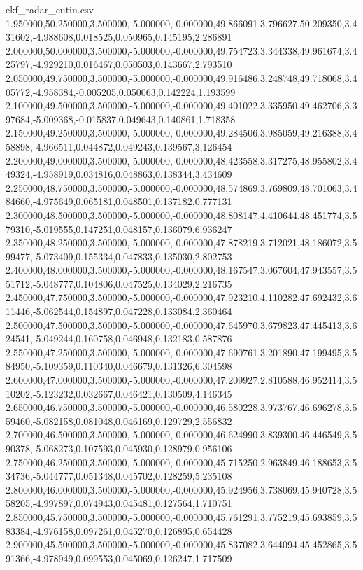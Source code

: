 \begin{filecontents*}[overwrite]{ekf_radar_cutin.csv}
1.950000,50.250000,3.500000,-5.000000,-0.000000,49.866091,3.796627,50.209350,3.431602,-4.988608,0.018525,0.050965,0.145195,2.286891
2.000000,50.000000,3.500000,-5.000000,-0.000000,49.754723,3.344338,49.961674,3.425797,-4.929210,0.016467,0.050503,0.143667,2.793510
2.050000,49.750000,3.500000,-5.000000,-0.000000,49.916486,3.248748,49.718068,3.405772,-4.958384,-0.005205,0.050063,0.142224,1.193599
2.100000,49.500000,3.500000,-5.000000,-0.000000,49.401022,3.335950,49.462706,3.397684,-5.009368,-0.015837,0.049643,0.140861,1.718358
2.150000,49.250000,3.500000,-5.000000,-0.000000,49.284506,3.985059,49.216388,3.458898,-4.966511,0.044872,0.049243,0.139567,3.126454
2.200000,49.000000,3.500000,-5.000000,-0.000000,48.423558,3.317275,48.955802,3.449324,-4.958919,0.034816,0.048863,0.138344,3.434609
2.250000,48.750000,3.500000,-5.000000,-0.000000,48.574869,3.769809,48.701063,3.484660,-4.975649,0.065181,0.048501,0.137182,0.777131
2.300000,48.500000,3.500000,-5.000000,-0.000000,48.808147,4.410644,48.451774,3.579310,-5.019555,0.147251,0.048157,0.136079,6.936247
2.350000,48.250000,3.500000,-5.000000,-0.000000,47.878219,3.712021,48.186072,3.599477,-5.073409,0.155334,0.047833,0.135030,2.802753
2.400000,48.000000,3.500000,-5.000000,-0.000000,48.167547,3.067604,47.943557,3.551712,-5.048777,0.104806,0.047525,0.134029,2.216735
2.450000,47.750000,3.500000,-5.000000,-0.000000,47.923210,4.110282,47.692432,3.611446,-5.062544,0.154897,0.047228,0.133084,2.360464
2.500000,47.500000,3.500000,-5.000000,-0.000000,47.645970,3.679823,47.445413,3.624541,-5.049244,0.160758,0.046948,0.132183,0.587876
2.550000,47.250000,3.500000,-5.000000,-0.000000,47.690761,3.201890,47.199495,3.584950,-5.109359,0.110340,0.046679,0.131326,6.304598
2.600000,47.000000,3.500000,-5.000000,-0.000000,47.209927,2.810588,46.952414,3.510202,-5.123232,0.032667,0.046421,0.130509,4.146345
2.650000,46.750000,3.500000,-5.000000,-0.000000,46.580228,3.973767,46.696278,3.559460,-5.082158,0.081048,0.046169,0.129729,2.556832
2.700000,46.500000,3.500000,-5.000000,-0.000000,46.624990,3.839300,46.446549,3.590378,-5.068273,0.107593,0.045930,0.128979,0.956106
2.750000,46.250000,3.500000,-5.000000,-0.000000,45.715250,2.963849,46.188653,3.534736,-5.044777,0.051348,0.045702,0.128259,5.235108
2.800000,46.000000,3.500000,-5.000000,-0.000000,45.924956,3.738069,45.940728,3.558205,-4.997897,0.074943,0.045481,0.127564,1.710751
2.850000,45.750000,3.500000,-5.000000,-0.000000,45.761291,3.775219,45.693859,3.583384,-4.976158,0.097261,0.045270,0.126895,0.654428
2.900000,45.500000,3.500000,-5.000000,-0.000000,45.837082,3.644094,45.452865,3.591366,-4.978949,0.099553,0.045069,0.126247,1.717509

\end{filecontents*}
